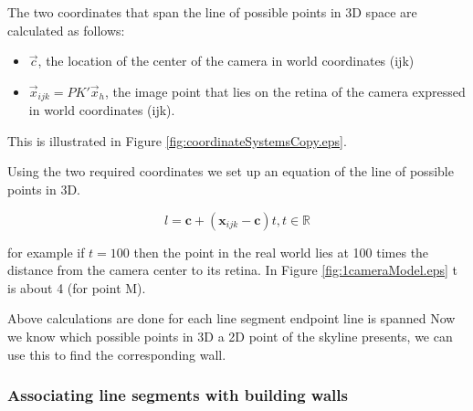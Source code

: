 	The two coordinates that span the line of possible points in 3D space are
	calculated as follows:
	\begin{itemize}
		\item $\vec{c}$, the location of the center of the camera in 
		world coordinates (ijk)
		\item $\vec{x}_{ijk} = P K' \vec{x}_{h}$, the image point that lies on the retina of
		the camera expressed in world coordinates (ijk).\\
	\end{itemize}
	This is illustrated in Figure \ref{fig:coordinateSystemsCopy.eps}.
	\clearpage



	Using the two required coordinates we set up an equation of the
	line of possible points in 3D.  

	 \[ l = \textbf{c} + (\textbf{x}_{ijk}-\textbf{c})t, t \in \mathbb{R} \]

	for example if $t=100$ then the point in the real world lies at 100 times
		the distance from the camera center to its retina.
	In Figure \ref{fig:1cameraModel.eps} t is about 4 (for point M).

	Above calculations are done for each line segment endpoint
	line is spanned 
	Now we know which possible points in 3D a 2D point of the skyline presents,
	we can use this to find the corresponding wall.


\subsubsection{Associating line segments with building walls}
